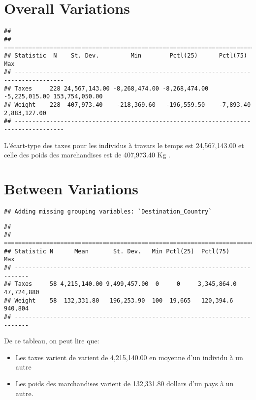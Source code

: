 \documentclass[
]{book}
\providecommand{\tightlist}{%
  \setlength{\itemsep}{0pt}\setlength{\parskip}{0pt}}
\begin{document}
\hypertarget{overall-variations}{%
\section{Overall Variations}\label{overall-variations}}

\begin{verbatim}
## 
## ====================================================================================
## Statistic  N    St. Dev.         Min        Pctl(25)      Pctl(75)         Max      
## ------------------------------------------------------------------------------------
## Taxes     228 24,567,143.00 -8,268,474.00 -8,268,474.00 -5,225,015.00 153,754,050.00
## Weight    228  407,973.40    -218,369.60   -196,559.50    -7,893.40    2,883,127.00 
## ------------------------------------------------------------------------------------
\end{verbatim}

L'écart-type des taxes pour les individus à travars le temps est 24,567,143.00 et celle des poids des marchandises est de 407,973.40 Kg .

\hypertarget{between-variations}{%
\section{Between Variations}\label{between-variations}}

\begin{verbatim}
## Adding missing grouping variables: `Destination_Country`
\end{verbatim}

\begin{verbatim}
## 
## ==========================================================================
## Statistic N      Mean       St. Dev.   Min Pctl(25)  Pctl(75)      Max    
## --------------------------------------------------------------------------
## Taxes     58 4,215,140.00 9,499,457.00  0     0     3,345,864.0 47,724,880
## Weight    58  132,331.80   196,253.90  100  19,665   120,394.6   940,804  
## --------------------------------------------------------------------------
\end{verbatim}

De ce tableau, on peut lire que:

\begin{itemize}
\tightlist
\item
  Les taxes varient de varient de 4,215,140.00 en moyenne d'un individu à un autre
\item
  Les poids des marchandises varient de 132,331.80 dollars d'un pays à un autre.
\end{itemize}
\end{document}
